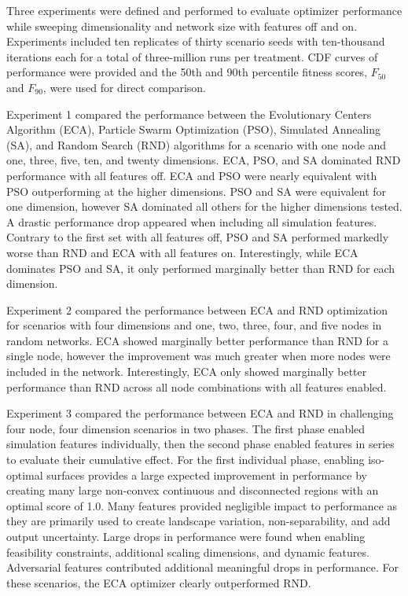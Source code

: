 \documentclass[a4paper]{article}
\begin{document}
Three experiments were defined and performed to evaluate optimizer performance while sweeping dimensionality and network size with features off and on. Experiments included ten replicates of thirty scenario seeds with ten-thousand iterations each for a total of three-million runs per treatment. CDF curves of performance were provided and the 50th and 90th percentile fitness scores, $F_{50}$ and $F_{90}$, were used for direct comparison.

Experiment 1 compared the performance between the Evolutionary Centers Algorithm (ECA), Particle Swarm Optimization (PSO), Simulated Annealing (SA), and Random Search (RND) algorithms for a scenario with one node and one, three, five, ten, and twenty dimensions. ECA, PSO, and SA dominated RND performance with all features off. ECA and PSO were nearly equivalent with PSO outperforming at the higher dimensions. PSO and SA were equivalent for one dimension, however SA dominated all others for the higher dimensions tested. A drastic performance drop appeared when including all simulation features. Contrary to the first set with all features off, PSO and SA performed markedly worse than RND and ECA with all features on. Interestingly, while ECA dominates PSO and SA, it only performed marginally better than RND for each dimension.

Experiment 2 compared the performance between ECA and RND optimization for scenarios with four dimensions and one, two, three, four, and five nodes in random networks. ECA showed marginally better performance than RND for a single node, however the improvement was much greater when more nodes were included in the network. Interestingly, ECA only showed marginally better performance than RND across all node combinations with all features enabled.

Experiment 3 compared the performance between ECA and RND in challenging four node, four dimension scenarios in two phases. The first phase enabled simulation features individually, then the second phase enabled features in series to evaluate their cumulative effect. For the first individual phase, enabling iso-optimal surfaces provides a large expected improvement in performance by creating many large non-convex continuous and disconnected regions with an optimal score of 1.0. Many features provided negligible impact to performance as they are primarily used to create landscape variation, non-separability, and add output uncertainty. Large drops in performance were found when enabling feasibility constraints, additional scaling dimensions, and dynamic features. Adversarial features contributed additional meaningful drops in performance. For these scenarios, the ECA optimizer clearly outperformed RND.
\end{document}
